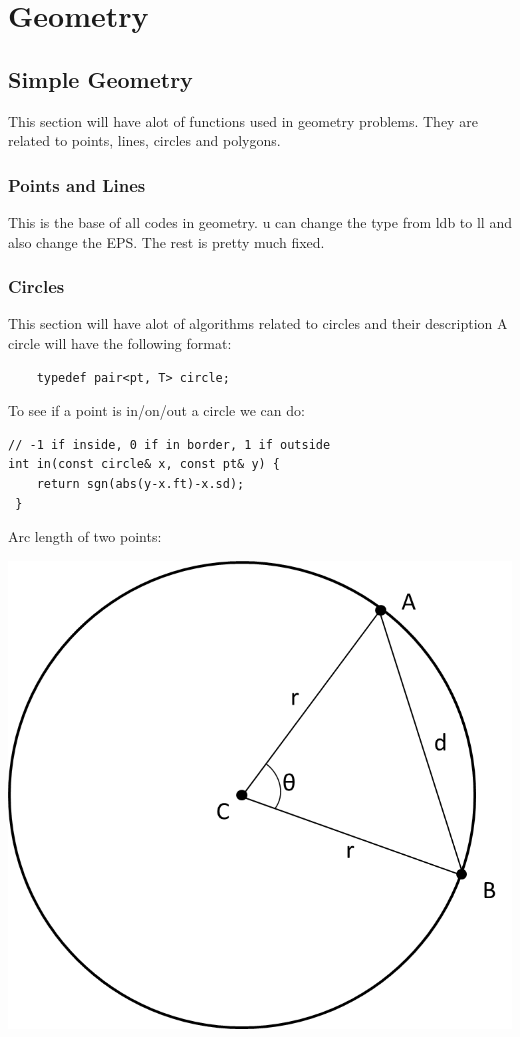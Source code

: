 \chapter{Geometry}
    \section{Simple Geometry}
    This section will have alot of functions used in geometry problems. They are related to points, lines, circles and polygons.
    \subsection{Points and Lines}
    This is the base of all codes in geometry. u can change the type from ldb to ll and also change the EPS. The rest is pretty much fixed.
    
    \subsection{Circles}
    This section will have alot of algorithms related to circles and their description
    A circle will have the following format:
    \begin{lstlisting}
    typedef pair<pt, T> circle;
    \end{lstlisting}
    
    
    To see if a point is in/on/out a circle we can do:
    \begin{lstlisting}
// -1 if inside, 0 if in border, 1 if outside
int in(const circle& x, const pt& y) { 
    return sgn(abs(y-x.ft)-x.sd); 
 }
    \end{lstlisting}
    Arc length of two points:

    \begin{center}
    \includegraphics[scale = 0.5]{imgs/arclength.png}
    \end{center}
    
